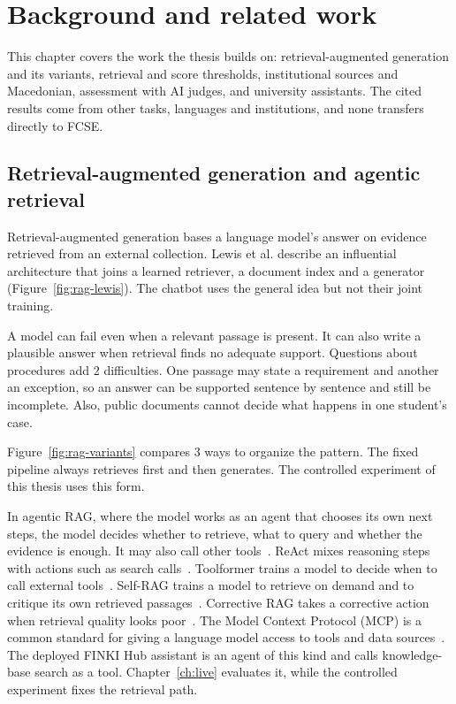 \section{Background and related work}
\label{ch:background}

This chapter covers the work the thesis builds on: retrieval-augmented generation and its variants, retrieval and score thresholds, institutional sources and Macedonian, assessment with AI judges, and university assistants. The cited results come from other tasks, languages and institutions, and none transfers directly to FCSE.

\subsection{Retrieval-augmented generation and agentic retrieval}
\label{sec:bg-agentic}

Retrieval-augmented generation bases a language model's answer on evidence retrieved from an external collection. Lewis et al. describe an influential architecture that joins a learned retriever, a document index and a generator~\cite{lewis2020rag} (Figure~\ref{fig:rag-lewis}). The chatbot uses the general idea but not their joint training.


 A model can fail even when a relevant passage is present. It can also write a plausible answer when retrieval finds no adequate support. Questions about procedures add 2 difficulties. One passage may state a requirement and another an exception, so an answer can be supported sentence by sentence and still be incomplete. Also, public documents cannot decide what happens in one student's case.

Figure~\ref{fig:rag-variants} compares 3 ways to organize the pattern. The fixed pipeline always retrieves first and then generates. The controlled experiment of this thesis uses this form.

In agentic RAG, where the model works as an agent that chooses its own next steps, the model decides whether to retrieve, what to query and whether the evidence is enough. It may also call other tools~\cite{singh2025agenticrag}. ReAct mixes reasoning steps with actions such as search calls~\cite{yao2023react}. Toolformer trains a model to decide when to call external tools~\cite{schick2023toolformer}. Self-RAG trains a model to retrieve on demand and to critique its own retrieved passages~\cite{asai2024selfrag}. Corrective RAG takes a corrective action when retrieval quality looks poor~\cite{yan2024crag}. The Model Context Protocol (MCP) is a common standard for giving a language model access to tools and data sources~\cite{anthropic2024mcp}. The deployed FINKI Hub assistant is an agent of this kind and calls knowledge-base search as a tool. Chapter~\ref{ch:live} evaluates it, while the controlled experiment fixes the retrieval path.

